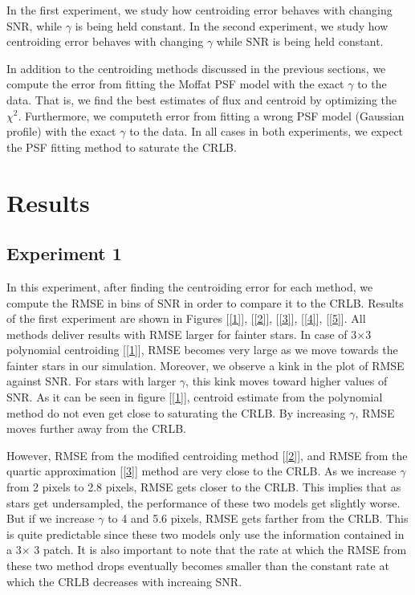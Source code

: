 \documentclass[12pt, preprint]{aastex}
\begin{document}
In the first experiment, we study how centroiding error behaves with changing
SNR, while $\gamma$ is being held constant. In the second experiment, we study 
how centroiding error behaves with changing $\gamma$ while SNR is being held constant.

In addition to the centroiding methods discussed in the previous sections,
we compute the error from fitting the Moffat PSF model with the exact $\gamma$ to
the data. That is, we find the best estimates of flux and centroid by
optimizing the $\chi^{2}$. Furthermore, we computeth error from fitting a
wrong PSF model (Gaussian profile) with the exact $\gamma$ to the data.
In all cases in both experiments, we expect the PSF fitting method to saturate 
the CRLB. 

\section{Results}\label{sec:results}

\subsection{Experiment 1}
   
In this experiment, after finding the centroiding error for each method,
we compute the RMSE in bins of SNR in order to compare it to the CRLB. 
Results of the first experiment are shown in Figures [\ref{1}], [\ref{2}], [\ref{3}], [\ref{4}], [\ref{5}]. All methods deliver results with RMSE larger for fainter stars.
In case of 3$\times$3 polynomial centroiding [\ref{1}], RMSE becomes very large as we move towards the fainter stars in our simulation. Moreover, we observe a kink in the plot of RMSE against SNR. For stars with larger $\gamma$, this kink moves toward higher values of SNR. As it can be seen in figure [\ref{1}], centroid estimate from the polynomial method do not even get close to saturating the CRLB. By increasing $\gamma$, RMSE moves further away from the CRLB.

However, RMSE from the modified centroiding method [\ref{2}], and RMSE from the quartic approximation [\ref{3}] method are very close to the CRLB. As we increase $\gamma$ from 2 pixels to 2.8 pixels, RMSE gets closer to the CRLB. This implies that as stars get undersampled, the performance of these two models get slightly worse. But if we increase $\gamma$ to 4 and 5.6 pixels, RMSE gets farther from the CRLB. This is quite predictable since these two models only use the information contained in a 3$\times$ 3 patch. It is also important to note that the rate at which the RMSE from these two method drops eventually becomes smaller than the constant rate at which the CRLB decreases with increaing SNR.
\end{document}
